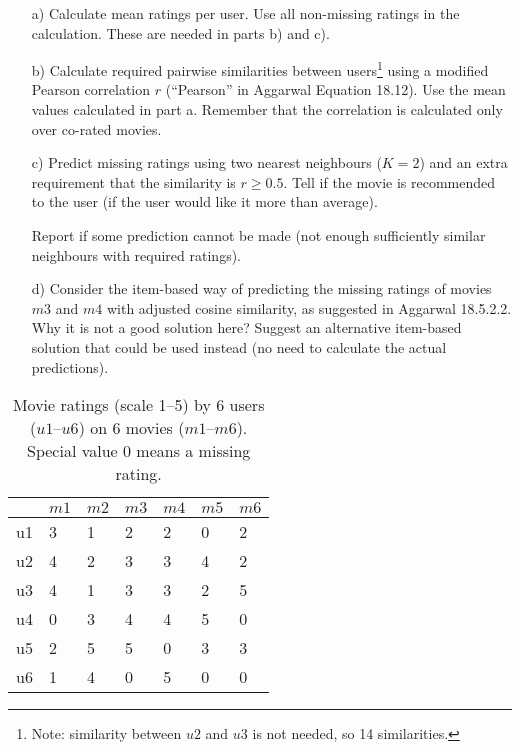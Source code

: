 \documentclass[a4paper,12pt]{article}
\begin{document}
\begin{itemize}
\item[a)] Calculate mean ratings per user. Use all non-missing ratings in the
calculation. These are needed in parts b) and c).

\item[b)] Calculate required pairwise similarities between
  users\footnote{Note: similarity between $u2$ and $u3$ is not needed,
    so 14 similarities.} using a modified Pearson correlation $r$
  (``Pearson'' in Aggarwal Equation 18.12). Use the mean values
  calculated in part a. Remember that the correlation is calculated
  only over co-rated movies.

\item[c)] Predict missing ratings using two nearest neighbours
  ($K=2$) and an extra requirement that the similarity is $r\geq
  0.5$. Tell if the movie is recommended to the user (if the user
  would like it more than average).

Report if some prediction cannot be made (not enough 
sufficiently similar neighbours with required ratings).

\item[d)] Consider the item-based way of predicting the missing ratings of
  movies $m3$ and $m4$ with adjusted cosine similarity, as suggested
  in Aggarwal 18.5.2.2. Why it is not a good solution here? Suggest an
  alternative item-based solution that could be used instead (no need
  to calculate the actual predictions).

\end{itemize}

\begin{table}[!h]
\begin{center}
\caption{Movie ratings (scale 1--5) by 6 users ($u1$--$u6$) on 6 movies 
($m1$--$m6$). Special value 0 means a missing rating.}
\label{movier}
\begin{tabular}{|l|l|l|l|l|l|l|}
\hline
&$m1$&$m2$&$m3$&$m4$&$m5$&$m6$\\
\hline
u1&3&1&2&2&0&2\\
u2&4&2&3&3&4&2\\
u3&4&1&3&3&2&5\\
u4&0&3&4&4&5&0\\
u5&2&5&5&0&3&3\\
u6&1&4&0&5&0&0\\
\hline
\end{tabular}
\end{center}
\end{table}
\end{document}

